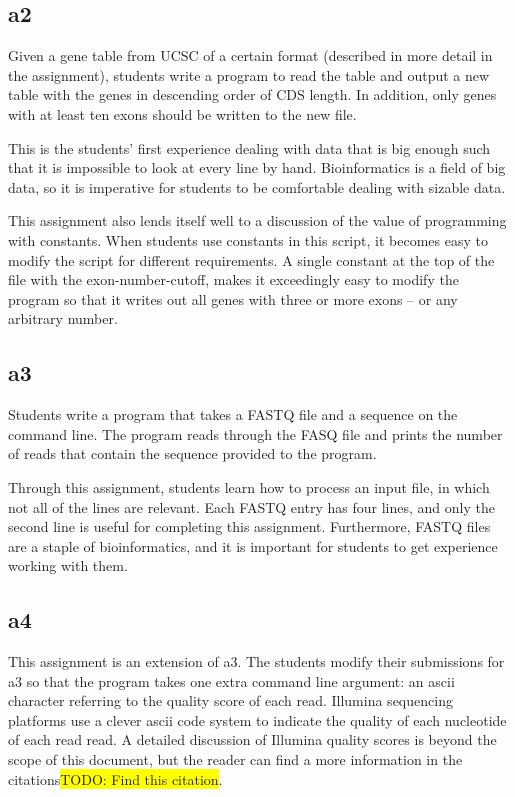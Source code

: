 \documentclass{report}
\newcommand{\hilight}[1]
{\colorbox{yellow}{#1}}
\begin{document}
\subsection{a2}
Given a gene table from UCSC of a certain format (described in more detail in the assignment), students write a program to read the table and output a new table with the genes in descending order of CDS length. In addition, only genes with at least ten exons should be written to the new file. 

This is the students' first experience dealing with data that is big enough such that it is impossible to look at every line by hand. Bioinformatics is a field of big data, so it is imperative for students to be comfortable dealing with sizable data.

This assignment also lends itself well to a discussion of the value of programming with constants. When students use constants in this script, it becomes easy to modify the script for different requirements. A single constant at the top of the file with the exon-number-cutoff, makes it exceedingly easy to modify the program so that it writes out all genes with three or more exons -- or any arbitrary number.

\subsection{a3}
Students write a program that takes a FASTQ file and a sequence on the command line. The program reads through the FASQ file and prints the number of reads that contain the sequence provided to the program.

Through this assignment, students learn how to process an input file, in which not all of the lines are relevant. Each FASTQ entry has four lines, and only the second line is useful for completing this assignment. Furthermore, FASTQ files are a staple of bioinformatics, and it is important for students to get experience working with them.

\subsection{a4}
This assignment is an extension of a3. The students modify their submissions for a3 so that the program takes one extra command line argument: an ascii character referring to the quality score of each read. Illumina sequencing platforms use a clever ascii code system to indicate the quality of each nucleotide of each read read. A detailed discussion of Illumina quality scores is beyond the scope of this document, but the reader can find a more information in the citations\hilight{TODO: Find this citation}.
\end{document}
